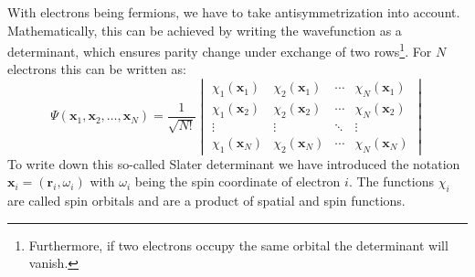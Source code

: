 With electrons being fermions, we have to take antisymmetrization into account. Mathematically, this can be achieved by writing the wavefunction as a determinant, which ensures parity change under exchange of two rows\footnote{Furthermore, if two electrons occupy the same orbital the determinant will vanish.}. For $N$ electrons this can be written as:
\begin{equation}
    \Psi(\mathbf{x}_1, \mathbf{x}_2, \ldots, \mathbf{x}_N) = \frac{1}{\sqrt{N!}}
    \begin{vmatrix}
    \chi_1(\mathbf{x}_1) & \chi_2(\mathbf{x}_1) & \cdots & \chi_N(\mathbf{x}_1) \\
    \chi_1(\mathbf{x}_2) & \chi_2(\mathbf{x}_2) & \cdots & \chi_N(\mathbf{x}_2) \\
    \vdots & \vdots & \ddots & \vdots \\
    \chi_1(\mathbf{x}_N) & \chi_2(\mathbf{x}_N) & \cdots & \chi_N(\mathbf{x}_N)
    \end{vmatrix}
\end{equation}
To write down this so-called Slater determinant we have introduced the notation $\mathbf{x}_i = (\mathbf{r}_i, \omega_i)$ with $\omega_i$ being the spin coordinate of electron $i$. The functions $\chi_i$ are called spin orbitals and are a product of spatial and spin functions. 

